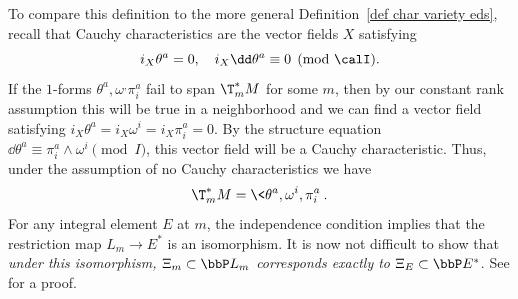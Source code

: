\begin{rem}
    To compare this definition to the more general Definition~\ref{def char variety eds}, recall that Cauchy characteristics are the vector fields $X$ satisfying 
    \[i_X \theta^a=0,\quad i_X\dd\theta^a\equiv 0\pmod{\calI}.\]
    If the $1$-forms $\theta^a,\omega^,\pi^a_i$ fail to span $\T^\ast_m M$ for some $m$, then by our constant rank assumption this will be true in a neighborhood and we can find a vector field satisfying $i_X\theta^a=i_X\omega^i=i_X\pi^a_i=0$. By the structure equation $\dd\theta^a\equiv\pi^a_i\wedge\omega^i\pmod{I}$, this vector field will be a Cauchy characteristic. Thus, under the assumption of no Cauchy characteristics we have 
    \[\T^\ast_m M=\<\theta^a,\omega^i,\pi^a_i\>.\]
    For any integral element $E$ at $m$, the independence condition implies that the restriction map $L_m\to E^\ast$ is an isomorphism. It is now not difficult to show that \emph{under this isomorphism, $\Xi_m\subset \bbP L_m$ corresponds exactly to $\Xi_E\subset \bbP E^\ast$}. See \cite[p.~183]{Bryant} for a proof.
\end{rem}


